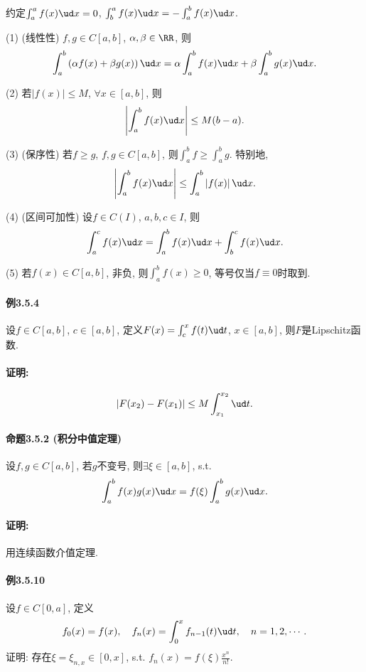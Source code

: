 约定$\int_{a}^{a}f(x)\ud x=0$, $\int_{b}^{a}f(x)\ud x=-\int_{a}^{b}f(x)\ud x$.

(1) (线性性) $f,g\in C[a,b]$, $\alpha,\beta\in\RR$, 则
\[
\int_{a}^{b}\left(\alpha f(x)+\beta g(x)\right)\ud x=\alpha\int_{a}^{b}f(x)\ud x+\beta\int_{a}^{b}g(x)\ud x.
\]

(2) 若$\left|f(x)\right|\le M$, $\forall x\in[a,b]$, 则
\[
\left|\int_{a}^{b}f(x)\ud x\right|\le M(b-a).
\]

(3) (保序性) 若$f\ge g$, $f,g\in C[a,b]$, 则$\int_{a}^{b}f\ge\int_{a}^{b}g$.
特别地, 
\[
\left|\int_{a}^{b}f(x)\ud x\right|\le\int_{a}^{b}\left|f(x)\right|\ud x.
\]

(4) (区间可加性) 设$f\in C(I)$, $a,b,c\in I$, 则
\[
\int_{a}^{c}f(x)\ud x=\int_{a}^{b}f(x)\ud x+\int_{b}^{c}f(x)\ud x.
\]

(5) 若$f(x)\in C[a,b]$, 非负, 则$\int_{a}^{b}f(x)\ge0$, 等号仅当$f\equiv0$时取到.

\paragraph{例3.5.4}

设$f\in C[a,b]$, $c\in[a,b]$, 定义$F(x)=\int_{c}^{x}f(t)\ud t$, $x\in[a,b]$,
则$F$是Lipschitz函数.

\paragraph{证明:}

\[
\left|F(x_{2})-F(x_{1})\right|\le M\int_{x_{1}}^{x_{2}}\ud t.
\]


\paragraph{命题3.5.2 (积分中值定理)}

设$f,g\in C[a,b]$, 若$g$不变号, 则$\exists\xi\in[a,b]$, s.t.
\[
\int_{a}^{b}f(x)g(x)\ud x=f(\xi)\int_{a}^{b}g(x)\ud x.
\]


\paragraph{证明:}

用连续函数介值定理.

\paragraph{例3.5.10}

设$f\in C[0,a]$, 定义
\[
f_{0}(x)=f(x),\quad f_{n}(x)=\int_{0}^{x}f_{n-1}(t)\ud t,\quad n=1,2,\cdots.
\]
证明: 存在$\xi=\xi_{n,x}\in[0,x]$, s.t. $f_{n}(x)=f(\xi)\frac{x^{n}}{n!}$.

